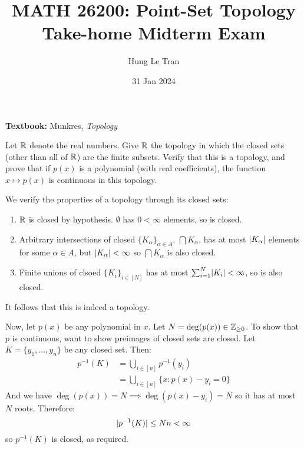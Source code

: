\documentclass[a4paper, 12pt]{article}
\title{MATH 26200: Point-Set Topology \\ \large Take-home Midterm Exam}
\date{31 Jan 2024}
\author{Hung Le Tran}
\begin{document}
\maketitle
\setcounter{section}{4}
\textbf{Textbook:} Munkres, \textit{Topology}  
\begin{problem} 
    Let $\mathbb{R}$ denote the real numbers. Give $\mathbb{R}$ the topology in which the closed sets (other than all of $\mathbb{R}$) are the finite subsets. Verify that this is a topology, and prove that if $p(x)$ is a polynomial (with real coefficients), the function $x \mapsto p(x)$ is continuous in this topology.
\end{problem}
\begin{solution}
    We verify the properties of a topology through its closed sets:
    \begin{enumerate} [1.]
        \item $\mathbb{R}$ is closed by hypothesis. $\emptyset$ has $0 < \infty$ elements, so is closed.
        \item Arbitrary intersections of closed $\{K_\alpha\}_{\alpha \in A}$, $\bigcap K_\alpha$, has at most $\lvert K_\alpha\rvert$ elements for some $\alpha \in A$, but $\lvert K_\alpha\rvert < \infty$ so $\bigcap K_\alpha$ is also closed.
        \item Finite unions of clsoed $\{K_i\}_{i \in [N]}$ has at most $\sum_{i=1}^{N} \lvert K_i\rvert  < \infty$, so is also closed.
    \end{enumerate}

    It follows that this is indeed a topology.

    Now, let $p(x)$ be any polynomial in $x$. Let $N = \deg (p(x)) \in \mathbb{Z}_{\geq 0}$. To show that $p$ is continuous, want to show preimages of closed sets are closed. Let $K = \{y_1, \ldots, y_n\}$ be any closed set. Then:
    \begin{align*}
    p^{-1}(K) &= \bigcup_{i \in [n]} p^{-1}(y_i) \\
    &= \bigcup_{i \in [n]} \{x : p(x) - y_i = 0\}
    \end{align*}
    And we have $\deg (p(x)) = N \implies \deg(p(x) - y_i) = N $ so it has at most $N$ roots. Therefore: 
    \begin{equation*}
    \lvert p^{-1}(K)\rvert \leq Nn < \infty    
    \end{equation*}
    so $p^{-1}(K)$ is closed, as required.
\end{solution}
\end{document}
